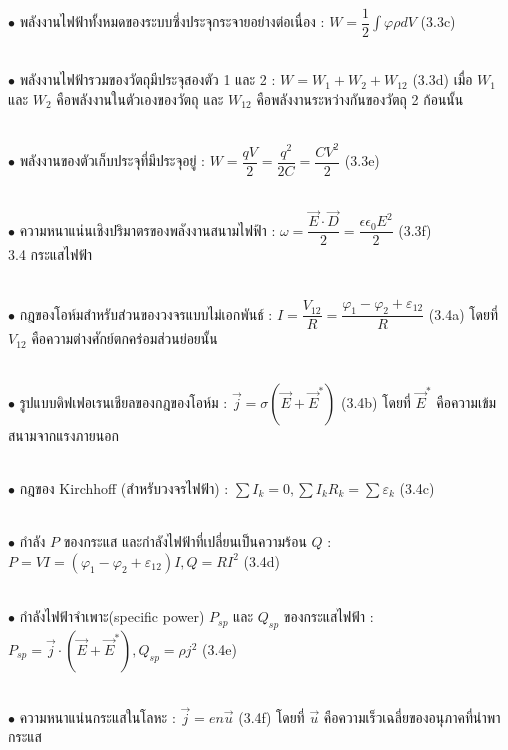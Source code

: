 \documentclass[a4paper,12pt]{article}
\begin{document}
~\\ $\bullet$ พลังงานไฟฟ้าทั้งหมดของระบบซึ่งประจุกระจายอย่างต่อเนื่อง :
$W = \dfrac{1}{2}\displaystyle \int \varphi\rho dV$                     (3.3c)

~\\ $\bullet$ พลังงานไฟฟ้ารวมของวัตถุมีประจุสองตัว 1 และ 2 :
$W = W_{1}+W_{2}+W_{12}$                            (3.3d)
เมื่อ $W_{1}$ และ $W_{2}$ คือพลังงานในตัวเองของวัตถุ และ $W_{12}$ คือพลังงานระหว่างกันของวัตถุ 2 ก้อนนั้น

~\\ $\bullet$ พลังงานของตัวเก็บประจุที่มีประจุอยู่ :
$W = \dfrac{qV}{2} = \dfrac{q^{2}}{2C} = \dfrac{CV^{2}}{2}$                    (3.3e)

~\\ $\bullet$ ความหนาแน่นเชิงปริมาตรของพลังงานสนามไฟฟ้า :
$\omega = \dfrac{\vec{E}\cdot\vec{D}}{2} = \dfrac{\epsilon\epsilon_{0}E^{2}}{2}$                    (3.3f)~\\

3.4 กระแสไฟฟ้า

~\\ $\bullet$ กฎของโอห์มสำหรับส่วนของวงจรแบบไม่เอกพันธ์ :
$I = \dfrac{V_{12}}{R} = \dfrac{\varphi_{1} - \varphi_{2} +\varepsilon_{12}}{R}$                (3.4a)
โดยที่ $V_{12}$ คือความต่างศักย์ตกคร่อมส่วนย่อยนั้น

~\\ $\bullet$ รูปแบบดิฟเฟอเรนเชียลของกฎของโอห์ม :
$\vec{j} = \sigma(\vec{E}+\vec{E}^{*})$                               (3.4b)
โดยที่ $\vec{E}^{*}$ คือความเข้มสนามจากแรงภายนอก

~\\ $\bullet$ กฎของ Kirchhoff (สำหรับวงจรไฟฟ้า) :
$\displaystyle \sum I_{k} = 0,       \displaystyle \sum I_{k}R_{k} = \displaystyle \sum \varepsilon_{k}$                               (3.4c)

~\\ $\bullet$ กำลัง $P$ ของกระแส และกำลังไฟฟ้าที่เปลี่ยนเป็นความร้อน $Q$ :
$P = VI = (\varphi_{1}-\varphi_{2}+\varepsilon_{12})I  ,          Q = RI^{2}$                       (3.4d)

~\\ $\bullet$ กำลังไฟฟ้าจำเพาะ(specific power) $P_{sp}$ และ $Q_{sp}$ ของกระแสไฟฟ้า :
$P_{sp} = \vec{j}\cdot(\vec{E}+\vec{E}^{*})  ,          Q_{sp} = \rho j^{2}$                   (3.4e)

~\\ $\bullet$ ความหนาแน่นกระแสในโลหะ :
$\vec{j} = en\vec{u}$                      (3.4f)
โดยที่ $\vec{u}$ คือความเร็วเฉลี่ยของอนุภาคที่นำพากระแส
\end{document}
